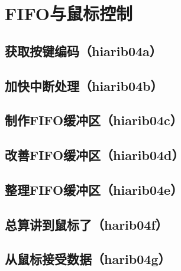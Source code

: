 ﻿\chapter{	FIFO与鼠标控制	}
\section{	获取按键编码（hiarib04a）	}
\section{	加快中断处理（hiarib04b）	}
\section{	制作FIFO缓冲区（hiarib04c）	}
\section{	改善FIFO缓冲区（hiarib04d）	}
\section{	整理FIFO缓冲区（hiarib04e）	}
\section{	总算讲到鼠标了（harib04f）	}
\section{	从鼠标接受数据（harib04g）	}

